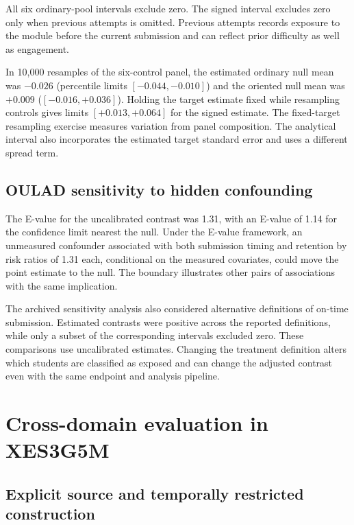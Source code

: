 All six ordinary-pool intervals exclude zero. The signed interval excludes zero only when previous attempts is omitted. Previous attempts records exposure to the module before the current submission and can reflect prior difficulty as well as engagement.

In 10,000 resamples of the six-control panel, the estimated ordinary null mean was $-0.026$ (percentile limits $[-0.044,-0.010]$) and the oriented null mean was $+0.009$ ($[-0.016,+0.036]$). Holding the target estimate fixed while resampling controls gives limits $[+0.013,+0.064]$ for the signed estimate. The fixed-target resampling exercise measures variation from panel composition. The analytical interval also incorporates the estimated target standard error and uses a different spread term.

\subsection{OULAD sensitivity to hidden confounding}

The E-value \cite{vanderweele2017} for the uncalibrated contrast was 1.31, with an E-value of 1.14 for the confidence limit nearest the null. Under the E-value framework, an unmeasured confounder associated with both submission timing and retention by risk ratios of 1.31 each, conditional on the measured covariates, could move the point estimate to the null. The boundary illustrates other pairs of associations with the same implication.



The archived sensitivity analysis also considered alternative definitions of on-time submission. Estimated contrasts were positive across the reported definitions, while only a subset of the corresponding intervals excluded zero. These comparisons use uncalibrated estimates. Changing the treatment definition alters which students are classified as exposed and can change the adjusted contrast even with the same endpoint and analysis pipeline.


\section{Cross-domain evaluation in XES3G5M}

\subsection{Explicit source and temporally restricted construction}

